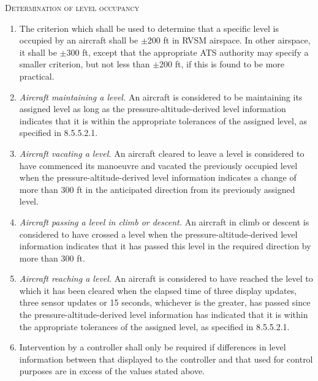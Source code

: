 \begin{enumeratesc}
    \item \textsc{Determination of level occupancy}
    \begin{enumerate}
        \item The criterion which shall be used to determine that a specific level is occupied by an aircraft shall be $\pm$200 ft in RVSM airspace. In other airspace, it shall be $\pm$300 ft, except that the appropriate ATS authority may specify a smaller criterion, but not less than $\pm$200 ft, if this is found to be more practical.
        \item \textit{Aircraft maintaining a level.} An aircraft is considered to be maintaining its assigned level as long as the pressure-altitude-derived level information indicates that it is within the appropriate tolerances of the assigned level, as specified in 8.5.5.2.1.
        \item \textit{Aircraft vacating a level.} An aircraft cleared to leave a level is considered to have commenced its manoeuvre and vacated the previously occupied level when the pressure-altitude-derived level information indicates a change of more than 300 ft in the anticipated direction from its previously assigned level.
        \item \textit{Aircraft passing a level in climb or descent.} An aircraft in climb or descent is considered to have crossed a level when the pressure-altitude-derived level information indicates that it has passed this level in the required direction by more than 300 ft.
        \item \textit{Aircraft reaching a level.} An aircraft is considered to have reached the level to which it has been cleared when the elapsed time of three display updates, three sensor updates or 15 seconds, whichever is the greater, has passed since the pressure-altitude-derived level information has indicated that it is within the appropriate tolerances of the assigned level, as specified in 8.5.5.2.1.
        \item Intervention by a controller shall only be required if differences in level information between that displayed to the controller and that used for control purposes are in excess of the values stated above.
    \end{enumerate}
\end{enumeratesc}

